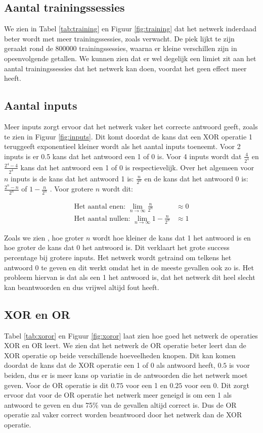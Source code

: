 \documentclass[10pt]{article}
\begin{document}
\subsection{Aantal trainingssessies}
We zien in Tabel \ref{tab:training} en Figuur \ref{fig:training} dat het netwerk inderdaad beter wordt met meer trainingssessies, zoals verwacht. De piek lijkt te zijn geraakt rond de 800000 trainingssessies, waarna er kleine verschillen zijn in opeenvolgende getallen. We kunnen zien dat er wel degelijk een limiet zit aan het aantal trainingssessies dat het netwerk kan doen, voordat het geen effect meer heeft.

\subsection{Aantal inputs}
Meer inputs zorgt ervoor dat het netwerk vaker het correcte antwoord geeft, zoals te zien in Figuur \ref{fig:inputs}. Dit komt doordat de kans dat een XOR operatie 1 teruggeeft exponentieel kleiner wordt als het aantal inputs toeneemt. Voor 2 inputs is er 0.5 kans dat het antwoord een 1 of 0 is. Voor 4 inputs wordt dat $\frac{4}{2^4}$ en $\frac{2^4-4}{2^4}$ kans dat het antwoord een 1 of 0 is respectievelijk. Over het algemeen voor $n$ inputs is de kans dat het antwoord 1 is: $\frac{n}{2^n}$ en de kans dat het antwoord 0 is: $\frac{2^n-n}{2^n}$ of $1-\frac{n}{2^n}$ . Voor grotere $n$ wordt dit:

\begin{align*}
     \text{Het aantal enen: } \lim_{n\to\infty} \frac{n}{2^n} & \approx 0  \\
     \text{Het aantal nullen: } \lim_{n\to\infty} 1 - \frac{n}{2^n} & \approx 1
\end{align*}

Zoals we zien , hoe groter $n$ wordt hoe kleiner de kans dat 1 het antwoord is en hoe groter de kans dat 0 het antwoord is. Dit verklaart het grote success percentage bij grotere inputs. Het netwerk wordt getraind om telkens het antwoord 0 te geven en dit werkt omdat het in de meeste gevallen ook zo is. Het probleem hiervan is dat als een 1 het antwoord is, dat het netwerk dit heel slecht kan beantwoorden en dus vrijwel altijd fout heeft.

\subsection{XOR en OR}
Tabel \ref{tab:xoror} en Figuur \ref{fig:xoror} laat zien hoe goed het netwerk de operaties XOR en OR leert. We zien dat het netwerk de OR operatie beter leert dan de XOR operatie op beide verschillende hoeveelheden knopen. Dit kan komen doordat de kans dat de XOR operatie een 1 of 0 als antwoord heeft, $0.5$ is voor beiden, dus er is meer kans op variatie in de antwoorden die het netwerk moet geven. Voor de OR operatie is dit $0.75$ voor een 1 en $0.25$ voor een 0. Dit zorgt ervoor dat voor de OR operatie het netwerk meer geneigd is om een 1 als antwoord te geven en dus 75\% van de gevallen altijd correct is. Dus de OR operatie zal vaker correct worden beantwoord door het netwerk dan de XOR operatie.
\end{document}

